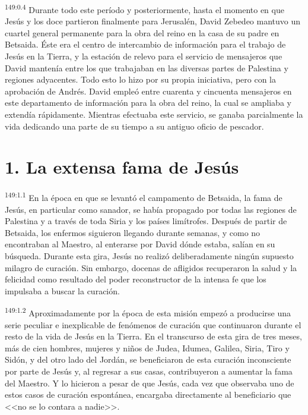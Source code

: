 \par 
\textsuperscript{149:0.4} Durante todo este período y posteriormente, hasta el momento en que Jesús y los doce partieron finalmente para Jerusalén, David Zebedeo mantuvo un cuartel general permanente para la obra del reino en la casa de su padre en Betsaida. Éste era el centro de intercambio de información para el trabajo de Jesús en la Tierra, y la estación de relevo para el servicio de mensajeros que David mantenía entre los que trabajaban en las diversas partes de Palestina y regiones adyacentes. Todo esto lo hizo por su propia iniciativa, pero con la aprobación de Andrés. David empleó entre cuarenta y cincuenta mensajeros en este departamento de información para la obra del reino, la cual se ampliaba y extendía rápidamente. Mientras efectuaba este servicio, se ganaba parcialmente la vida dedicando una parte de su tiempo a su antiguo oficio de pescador.

\section*{1. La extensa fama de Jesús}
\par 
\textsuperscript{149:1.1} En la época en que se levantó el campamento de Betsaida, la fama de Jesús, en particular como sanador, se había propagado por todas las regiones de Palestina y a través de toda Siria y los países limítrofes. Después de partir de Betsaida, los enfermos siguieron llegando durante semanas, y como no encontraban al Maestro, al enterarse por David dónde estaba, salían en su búsqueda. Durante esta gira, Jesús no realizó deliberadamente ningún supuesto milagro de curación. Sin embargo, docenas de afligidos recuperaron la salud y la felicidad como resultado del poder reconstructor de la intensa fe que los impulsaba a buscar la curación.

\par 
\textsuperscript{149:1.2} Aproximadamente por la época de esta misión empezó a producirse una serie peculiar e inexplicable de fenómenos de curación que continuaron durante el resto de la vida de Jesús en la Tierra. En el transcurso de esta gira de tres meses, más de cien hombres, mujeres y niños de Judea, Idumea, Galilea, Siria, Tiro y Sidón, y del otro lado del Jordán, se beneficiaron de esta curación inconsciente por parte de Jesús y, al regresar a sus casas, contribuyeron a aumentar la fama del Maestro. Y lo hicieron a pesar de que Jesús, cada vez que observaba uno de estos casos de curación espontánea, encargaba directamente al beneficiario que <<no se lo contara a nadie>>.

